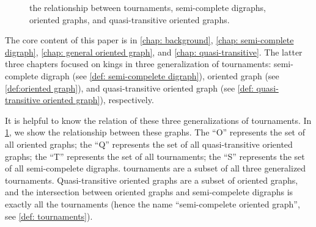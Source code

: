 \begin{figure}
  \centering
  \caption{the relationship between tournaments,
    semi-complete digraphs, oriented graphs,
    and quasi-transitive oriented graphs.}
  \label{fig: generalized tournaments relationship}  %
\end{figure}

The core content of this paper is in
\cref{chap: background}, \cref{chap: semi-complete digraph},
\cref{chap: general oriented graph},
and \cref{chap: quasi-transitive}.
The latter three chapters focused on kings in
three generalization of tournaments:
semi-complete digraph (see \cref{def: semi-compelete digraph}),
oriented graph (see \cref{def:oriented graph}),
and quasi-transitive oriented graph
(see \cref{def: quasi-transitive oriented graph}),
respectively.

It is helpful to know the relation of these
three generalizations of tournaments.
In \cref{fig: generalized tournaments relationship},
we show the relationship between these graphs.
The ``O'' represents the set of all oriented graphs;
the ``Q'' represents the set of all quasi-transitive oriented graphs;
the ``T'' represents the set of all tournaments;
the ``S'' represents the set of all semi-compelete digraphs.
tournaments are a subset of all three generalized tournaments.
Quasi-transitive oriented graphs are a subset of oriented graphs,
and the intersection between oriented graphs and
semi-compelete digraphs is exactly all the tournaments
(hence the name ``semi-compelete oriented graph'',
see \cref{def: tournaments}).


